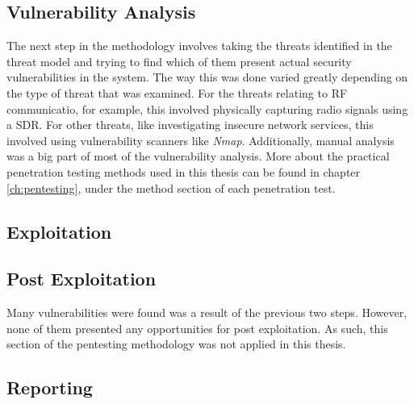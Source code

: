 \subsection{Vulnerability Analysis}
The next step in the methodology involves taking the threats identified in the threat model and trying to find which of them present actual security vulnerabilities in the system. The way this was done varied greatly depending on the type of threat that was examined. For the threats relating to \gls{RF} communicatio, for example, this involved physically capturing radio signals using a \gls{SDR}. For other threats, like investigating insecure network services, this involved using vulnerability scanners like \textit{Nmap}. Additionally, manual analysis was a big part of most of the vulnerability analysis. More about the practical penetration testing methods used in this thesis can be found in chapter \ref{ch:pentesting}, under the method section of each penetration test.

\subsection{Exploitation}
\todo

\subsection{Post Exploitation}
Many vulnerabilities were found was a result of the previous two steps. However, none of them presented any opportunities for post exploitation. As such, this section of the pentesting methodology was not applied in this thesis.

\subsection{Reporting}
\todo

